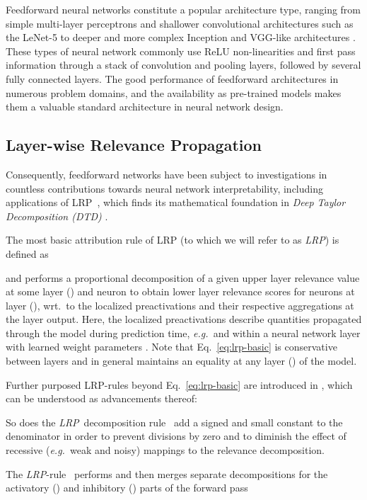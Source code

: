 \documentclass[conference]{IEEEtran}
\def\eg{\emph{e.g.~}}
\def\wrt{wrt.~}
\newcommand{\lrpz}[0]{\emph{LRP}}
\newcommand{\lrpeps}[0]{\emph{LRP}}
\newcommand{\lrpalphabeta}[0]{\emph{LRP}}
\begin{document}
Feedforward neural networks constitute a popular architecture type, ranging from simple multi-layer perceptrons and shallower convolutional architectures
such as the LeNet-5 \cite{lecun1998gradient}
to deeper and more complex Inception \cite{szegedy2016rethinking} and VGG-like architectures \cite{simonyan2014very}.
These types of neural network commonly use ReLU non-linearities and first pass information through a stack of convolution and pooling layers, followed by several fully connected layers.
The good performance of feedforward architectures in numerous problem domains,
and the availability as pre-trained models makes them a valuable standard architecture in neural network design.

\subsection{Layer-wise Relevance Propagation}
Consequently, feedforward networks have been subject to investigations in countless contributions towards neural network interpretability, including applications of LRP~\cite{bach2015pixel,lapuschkin2016analyzing,samek2016evaluating},
which finds its mathematical foundation in \emph{Deep Taylor Decomposition (DTD)} \cite{montavon2017explaining}.

The most basic attribution rule of LRP (to which we will refer to as \lrpz) is defined as

and performs a proportional decomposition of a given upper layer relevance value  at some layer \mbox{()}  and neuron  to obtain lower layer relevance scores  for neurons  at layer (), \wrt to the localized preactivations  and their respective aggregations  at the layer output.
Here, the localized preactivations  describe quantities propagated through the model during prediction time, \eg  and  within a neural network layer with learned weight parameters .
Note that Eq.~\eqref{eq:lrp-basic} is conservative between layers and in general maintains an equality  at any layer () of the model.

Further purposed LRP-rules beyond Eq.~\eqref{eq:lrp-basic} are introduced in \cite{bach2015pixel}, which can be understood as advancements thereof:

So does the \lrpeps~decomposition rule~\cite{bach2015pixel} add a signed and small constant  to the denominator in order to prevent divisions by zero and to diminish the effect of recessive (\eg weak and noisy) mappings  to the relevance decomposition.


The \lrpalphabeta-rule~\cite{bach2015pixel} performs and then merges separate decompositions for the activatory () and inhibitory () parts of the forward pass
\end{document}
